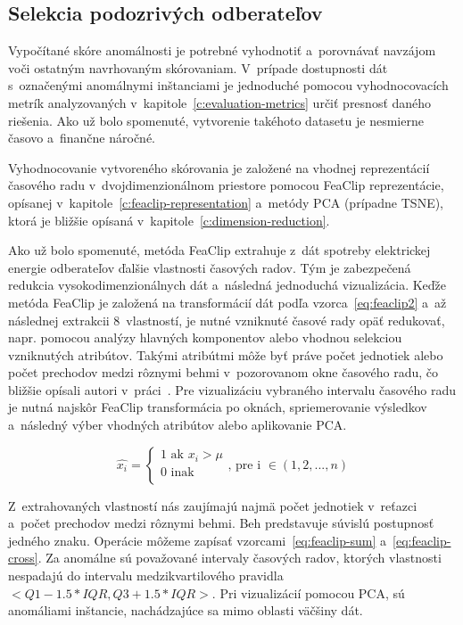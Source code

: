 \documentclass[a4paper,twoside,slovak,12pt,appendix]{article}
\begin{document}
\subsection{Selekcia podozrivých odberateľov}
Vypočítané skóre anomálnosti je potrebné vyhodnotiť a~porovnávať navzájom voči
ostatným navrhovaným skórovaniam. V~prípade dostupnosti dát s~označenými
anomálnymi inštanciami je jednoduché pomocou vyhodnocovacích metrík
analyzovaných v~kapitole~\ref{c:evaluation-metrics} určiť presnosť daného
riešenia. Ako už bolo spomenuté, vytvorenie takéhoto datasetu je nesmierne
časovo a~finančne náročné.

Vyhodnocovanie vytvoreného skórovania je založené na vhodnej reprezentácií
časového radu v~dvojdimenzionálnom priestore pomocou FeaClip reprezentácie,
opísanej v~kapitole~\ref{c:feaclip-representation} a~metódy PCA (prípadne TSNE),
ktorá je bližšie opísaná v~kapitole~\ref{c:dimension-reduction}.

Ako už bolo spomenuté, metóda FeaClip extrahuje z~dát spotreby elektrickej
energie odberateľov ďalšie vlastnosti časových radov. Tým je zabezpečená
redukcia vysokodimenzionálnych dát a~následná jednoduchá vizualizácia. Keďže
metóda FeaClip je založená na transformácií dát podľa vzorca~\ref{eq:feaclip2}
a~až následnej extrakcii 8~vlastností, je nutné vzniknuté časové rady opäť
redukovať, napr. pomocou analýzy hlavných komponentov alebo vhodnou selekciou
vzniknutých atribútov. Takými atribútmi môže byť práve počet jednotiek alebo
počet prechodov medzi rôznymi behmi v~pozorovanom okne časového radu, čo bližšie
opísali autori v~práci~\cite{Laurinec2018}. Pre vizualizáciu vybraného intervalu
časového radu je nutná najskôr FeaClip transformácia po oknách, spriemerovanie
výsledkov a~následný výber vhodných atribútov alebo aplikovanie PCA.

\begin{equation}
  \hat{x_i} =
  \begin{cases}
    1 \text{ ak } x_i > \mu \\
    0 \text{ inak } \\
  \end{cases}
  \text{, pre i } \in (1, 2, ..., n)
  \label{eq:feaclip2}
\end{equation}

\noindent
Z~extrahovaných vlastností nás zaujímajú najmä počet jednotiek v~reťazci a~počet
prechodov medzi rôznymi behmi. Beh predstavuje súvislú postupnosť jedného znaku.
Operácie môžeme zapísať vzorcami~\ref{eq:feaclip-sum} a~\ref{eq:feaclip-cross}.
Za anomálne sú považované intervaly časových radov, ktorých vlastnosti nespadajú
do intervalu medzikvartilového pravidla $<Q1 - 1.5 * IQR, Q3 + 1.5 * IQR>$. Pri
vizualizácií pomocou PCA, sú anomáliami inštancie, nachádzajúce sa mimo oblasti
väčšiny dát.
\end{document}
